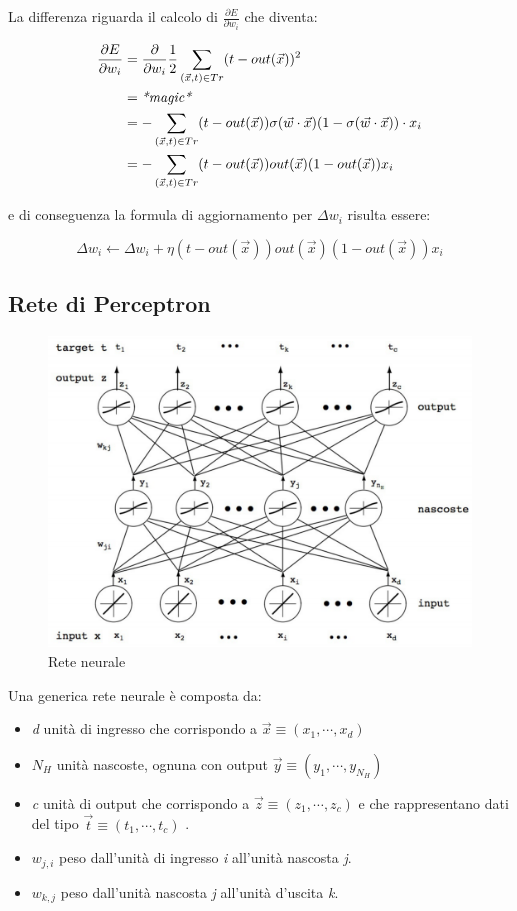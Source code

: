 La differenza riguarda il calcolo di $\frac{\partial E}{\partial w_i}$ che diventa:

\begin{align*}
\frac{\partial E}{\partial w_i} &= \frac{\partial}{\partial w_i} \frac{1}{2} \sum_{(\vec{x},t) \in Tr} (t - out(\vec{x}))^2 \\
	&= \text{\textit{*magic*}} \\
	&= - \sum_{(\vec{x},t) \in Tr} (t - out(\vec{x})) \sigma(\vec{w} \cdot \vec{x})(1-\sigma(\vec{w} \cdot \vec{x}))\cdot x_i \\
	&= - \sum_{(\vec{x},t) \in Tr} (t - out(\vec{x})) out(\vec{x})  (1-out(\vec{x})) x_i \\
\end{align*}

e di conseguenza la formula di aggiornamento per $\Delta w_i$ risulta essere:

$$
\Delta w_i \leftarrow \Delta w_i + \eta (t - out(\vec{x})) out(\vec{x})  (1-out(\vec{x})) x_i
$$
\subsection{Rete di Perceptron}\label{rete-di-perceptron}

\begin{figure}[htbp]
\centering
\includegraphics[width=\textwidth]{./notes/immagini/l10-rete.png}
\caption{Rete neurale}
\end{figure}

Una generica rete neurale è composta da:

\begin{itemize}
\item \textit{d} unità di ingresso che corrispondo a $\vec{x} \equiv (x_1, \cdots, x_d)$
\item $N_H$ unità nascoste, ognuna con output $\vec{y} \equiv (y_1, \cdots, y_{N_H})$
\item \textit{c} unità di output che corrispondo a $\vec{z} \equiv (z_1, \cdots, z_c)$ e che rappresentano dati del tipo $\vec{t} \equiv (t_1, \cdots, t_c)$ .
\item $w_{j,i}$ peso dall'unità di ingresso \textit{i} all'unità nascosta \textit{j}.
\item $w_{k,j}$ peso dall'unità nascosta \textit{j} all'unità d'uscita \textit{k}.
\end{itemize}

